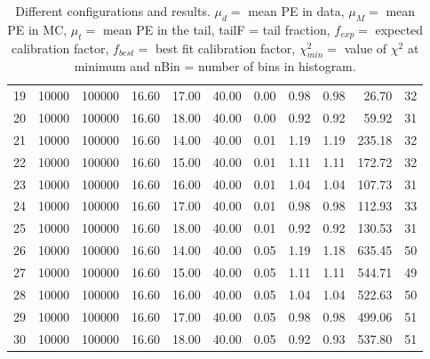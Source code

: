 \begin{table}[htp]
\begin{center}
\begin{tabular}{|r|rr| rr| rr| rr| rr|}
    19& 10000&100000& 16.60& 17.00& 40.00&  0.00&  0.98&  0.98& 26.70&    32 \\ 
    20& 10000&100000& 16.60& 18.00& 40.00&  0.00&  0.92&  0.92& 59.92&    31 \\ 
\hline 
    21& 10000&100000& 16.60& 14.00& 40.00&  0.01&  1.19&  1.19&235.18&    32 \\ 
    22& 10000&100000& 16.60& 15.00& 40.00&  0.01&  1.11&  1.11&172.72&    32 \\ 
    23& 10000&100000& 16.60& 16.00& 40.00&  0.01&  1.04&  1.04&107.73&    31 \\ 
    24& 10000&100000& 16.60& 17.00& 40.00&  0.01&  0.98&  0.98&112.93&    33 \\ 
    25& 10000&100000& 16.60& 18.00& 40.00&  0.01&  0.92&  0.92&130.53&    31 \\ 
\hline 
    26& 10000&100000& 16.60& 14.00& 40.00&  0.05&  1.19&  1.18&635.45&    50 \\ 
    27& 10000&100000& 16.60& 15.00& 40.00&  0.05&  1.11&  1.11&544.71&    49 \\ 
    28& 10000&100000& 16.60& 16.00& 40.00&  0.05&  1.04&  1.04&522.63&    50 \\ 
    29& 10000&100000& 16.60& 17.00& 40.00&  0.05&  0.98&  0.98&499.06&    51 \\ 
    30& 10000&100000& 16.60& 18.00& 40.00&  0.05&  0.92&  0.93&537.80&    51 \\ 
\hline 
\end{tabular} 
\label{tab:results} 
\caption{Different configurations and results. $\mu_d = $ mean PE in data, $\mu_M =$ mean PE in MC, $\mu_t = $ mean PE in the tail, tailF = tail fraction, $f_{exp}=$ expected calibration factor, $f_{best} =$ best fit calibration factor, $\chi^2_{min} = $ value of $\chi^2$ at minimum and nBin = number of bins in histogram.} 
\end{center} 
\end{table} 
